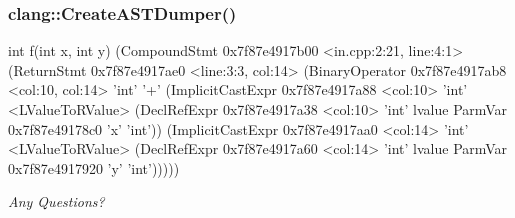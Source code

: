 \documentclass[12pt,xgraphicx=dvips,xcolor=dvips]{beamer}
\begin{document}
\begin{frame}[containsverbatim]
  \frametitle{clang::CreateASTDumper()}

  \begin{semiverbatim}
int f(int x, int y) (CompoundStmt 0x7f87e4917b00 
                     <in.cpp:2:21, line:4:1>
 (ReturnStmt 0x7f87e4917ae0 <line:3:3, col:14>
  (BinaryOperator 0x7f87e4917ab8 <col:10, col:14> 'int' '+'
   (ImplicitCastExpr 0x7f87e4917a88 <col:10>
    'int' <LValueToRValue>
    (DeclRefExpr 0x7f87e4917a38 <col:10> 'int'
     lvalue ParmVar 0x7f87e49178c0 'x' 'int'))
    (ImplicitCastExpr 0x7f87e4917aa0 <col:14>
     'int' <LValueToRValue>
     (DeclRefExpr 0x7f87e4917a60 <col:14> 'int'
      lvalue ParmVar 0x7f87e4917920 'y' 'int')))))\end{semiverbatim}
\end{frame}

\begin{frame}
  \begin{center}
    {\LARGE\it Any Questions?}
  \end{center}
\end{frame}

\end{document}
